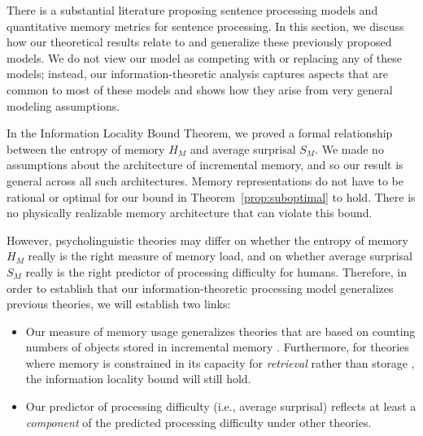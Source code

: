 There is a substantial literature proposing sentence processing models and quantitative memory metrics for sentence processing.
In this section, we discuss how our theoretical results relate to and generalize these previously proposed models.
We do not view our model as competing with or replacing any of these models; instead, our information-theoretic analysis captures aspects that are common to most of these models and shows how they arise from very general modeling assumptions. 

In the Information Locality Bound Theorem, we proved a formal relationship between the entropy of memory $H_M$ and average surprisal $S_M$. 
We made no assumptions about the architecture of incremental memory, and so our result is general across all such architectures.
Memory representations do not have to be rational or optimal for our bound in Theorem~\ref{prop:suboptimal} to hold.
There is no physically realizable memory architecture that can violate this bound.

However, psycholinguistic theories may differ on whether the entropy of memory $H_M$ really is the right measure of memory load, and on whether average surprisal $S_M$ really is the right predictor of processing difficulty for humans. Therefore, in order to establish that our information-theoretic processing model generalizes previous theories, we will establish two links:
\begin{itemize}
    \item Our measure of memory usage generalizes theories that are based on counting numbers of objects stored in incremental memory \citep[e.g.,][]{yngve1960model,miller-finitary-1963,frazier1985syntactic,gibson1998linguistic,kobele2013memory,graf2014evaluating,GrafEtAl15MOL,gerth2015memory,GrafEtAl17JLM,desanto2020parsing}. Furthermore, for theories where memory is constrained in its capacity for \emph{retrieval} rather than storage \citep[e.g.,][]{mcelree-memory-2003,lewis-activation-based-2005}, the information locality bound will still hold.
    \item Our predictor of processing difficulty (i.e., average surprisal) reflects at least a \emph{component} of the predicted processing difficulty under other theories.
\end{itemize}

